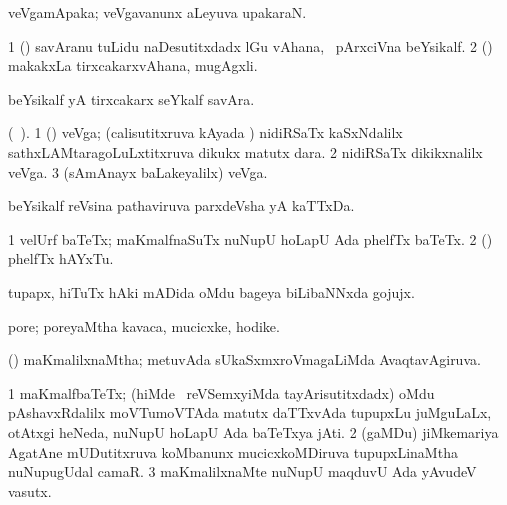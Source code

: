 \bentry
{} 
\gl{\nA}
\expl{}
\bmng
 veVgamApaka; veVgavanunx aLeyuva upakaraN. 
\emng
\eentry

\bentry
{} 
\gl{\nA}
\expl{}
\bmng
\bnum
\num{1} (\ca) savAranu tuLidu naDesutitxdadx lGu vAhana, \kanmu\ pArxciVna beYsikalf. 
\num{2} (\ame) makakxLa tirxcakarxvAhana, mugAgxli. 
\enum
\emng
\eentry

\bentry
{} 
\gl{\nA}
\expl{}
\bmng
 beYsikalf yA tirxcakarx seYkalf savAra. 
\emng
\eentry

\bentry
{} 
\gl{\nA}(\bava\ ). 
\bmng
\bnum
\num{1} (\Bwvi) veVga; (calisutitxruva kAyada \vi) nidiRSaTx kaSxNdalilx sathxLAMtaragoLuLxtitxruva dikukx matutx dara. 
\num{2} nidiRSaTx dikikxnalilx veVga. 
\num{3} (sAmAnayx baLakeyalilx) veVga. 
\enum
\emng

\noindent 
\gl{\pagu}
\expl{}
\bmng
\emng
\eentry

\bentry 
{}
\gl{\nA}
\bmng
beYsikalf reVsina pathaviruva parxdeVsha yA kaTTxDa. 
\emng
\eentry

\bentry
{} 
\gl{\nA}
\expl{}
\bmng
\bnum
\num{1} velUrf baTeTx; maKmalfnaSuTx nuNupU hoLapU Ada phelfTx baTeTx. 
\num{2} (\pArxparx) phelfTx hAYxTu. 
\enum
\emng
\eentry

\bentry
{} 
\gl{\nA}
\expl{}
\bmng
\emng
\eentry

\bentry
{} 
\gl{\nA}
\expl{}
\bmng
 tupapx, hiTuTx hAki mADida oMdu bageya biLibaNNxda gojujx. 
\emng
\eentry

\bentry
{}
\gl{\nA}
\bmng
 pore; poreyaMtha kavaca, mucicxke, hodike. 
\emng
\eentry

\bentry
{} 
\gl{\gu}
\expl{}
\bmng
 (\savi) maKmalilxnaMtha; metuvAda sUkaSxmxroVmagaLiMda AvaqtavAgiruva. 
\emng
\eentry

\bentry
{} 
\gl{\nA}
\expl{}
\bmng
\bnum
\num{1} maKmalfbaTeTx; (hiMde \kanmu\ reVSemxyiMda tayArisutitxdadx) oMdu pAshavxRdalilx moVTumoVTAda matutx daTTxvAda tupupxLu juMguLaLx, otAtxgi heNeda, nuNupU hoLapU Ada baTeTxya jAti. 
\num{2} (gaMDu) jiMkemariya AgatAne mUDutitxruva koMbanunx mucicxkoMDiruva tupupxLinaMtha nuNupugUdal camaR. 
\num{3} maKmalilxnaMte nuNupU maqduvU Ada yAvudeV vasutx. 
\enum
\emng

